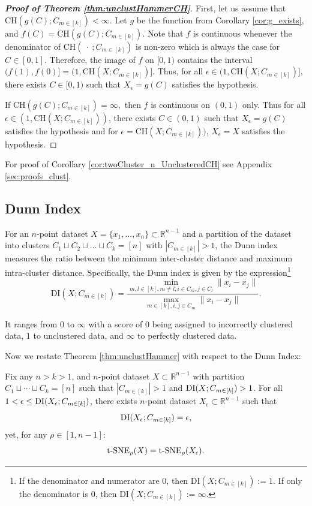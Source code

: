 \begin{proof}[\textbf{Proof of Theorem \ref{thm:unclustHammerCH}}]
    First, let us assume that $\text{CH}(g(C); C_{m \in [k]}) < \infty$. Let $g$ be the function from Corollary \ref{cor:g_exists}, and $f(C) = \text{CH}(g(C); C_{m \in [k]})$. Note that $f$ is continuous whenever the denominator of $\text{CH}(\ \cdot\ ; C_{m \in [k]})$ is non-zero which is always the case for $C \in [0,1]$. Therefore, the image of $f$ on $[0,1)$ contains the interval $(f(1), f(0)] = (1, \text{CH}(X ; C_{m \in [k]})]$. Thus, for all $\epsilon \in (1, \text{CH}(X ; C_{m \in [k]})]$, there exists $C \in [0,1)$ such that $X_\epsilon = g(C)$ satisfies the hypothesis.

    If $\text{CH}(g(C); C_{m \in [k]}) = \infty,$ then $f$ is continuous on $(0,1)$ only. Thus for all ${\epsilon \in (1, \text{CH}(X ; C_{m \in [k]}))}$, there exists $C \in (0,1)$ such that $X_\epsilon = g(C)$ satisfies the hypothesis and for $\epsilon =\text{CH}(X ; C_{m \in [k]}))$, $X_\epsilon = X$ satisfies the hypothesis.
\end{proof}

For proof of Corollary \ref{cor:twoCluster_n_UnclusteredCH} see Appendix \ref{sec:proofs_clust}.

\subsection{Dunn Index}
\label{sec:Dunnindex}
For an $n$-point dataset $X = \{x_1, \dots, x_n\} \subset \mathbb{R}^{n-1}$ and a partition of the dataset into clusters $C_1 \sqcup C_2 \sqcup \dots \sqcup C_k = [n]$ with $|C_{m\in[k]}| > 1$, the Dunn index measures the ratio between the minimum inter-cluster distance and maximum intra-cluster distance. Specifically, the Dunn index is given by the expression\footnote{If the denominator and numerator are $0$, then $\text{DI}(X; C_{m \in [k]}) := 1$. If only the denominator is 0, then $\text{DI}(X; C_{m \in [k]}) := \infty$.}
$$\text{DI}(X; C_{m \in [k]}) = \frac{\min_{m,l \in [k], m\neq l, i \in C_m, j \in C_l} \lVert x_i - x_j \rVert}{\max_{m \in [k], i,j \in C_m} \lVert x_i - x_j \rVert}.$$


It ranges from $0$ to $\infty$ with a score of $0$ being assigned to incorrectly clustered data, $1$ to unclustered data, and $\infty$ to perfectly clustered data.

Now we restate Theorem \ref{thm:unclustHammer} with respect to the Dunn Index:

\begin{theorem}
\label{thm:unclustHammerDunn}
    Fix any $n > k > 1$, and $n$-point dataset ${X} \subset \mathbb{R}^{n-1}$ with partition $C_1 \sqcup \cdots \sqcup C_k = [n]$ such that $|C_{m\in[k]}| > 1$ and $\textup{DI}({X}; C_{m\in[k]}) > 1$. For all $1 < \epsilon \leq \textup{DI}({X}_\epsilon; C_{m\in[k]})$, there exists $n$-point dataset ${X}_\epsilon \subset \mathbb{R}^{n-1}$ such that 
    $$\textup{DI}({X}_\epsilon; C_{m\in[k]}) = \epsilon, $$
    yet, for any $\rho \in [1, n-1]$:
    $${\operatorname*{t-SNE}}_\rho({X}) = {\operatorname*{t-SNE}}_\rho({X}_\epsilon).$$
\end{theorem}

